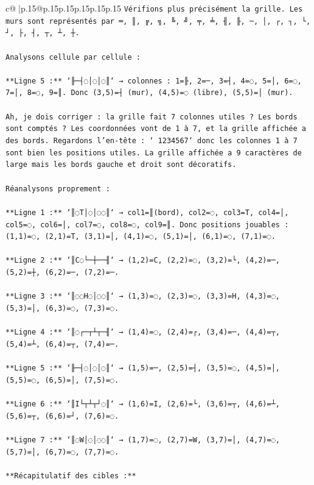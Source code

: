 \documentclass{article}
\begin{document}
{\begin{supertabular}{c@{$\;$}|p{.15\linewidth}@{}p{.15\linewidth}p{.15\linewidth}p{.15\linewidth}p{.15\linewidth}p{.15\linewidth}}
{{{\texttt{Vérifions plus précisément la grille. Les murs sont représentés par ═, ║, ╔, ╗, ╚, ╝, ╤, ╧, ╢, ╟, ─, │, ┌, ┐, └, ┘, ├, ┤, ┬, ┴, ┼.} \\
\\ 
\texttt{Analysons cellule par cellule :} \\
\\ 
\texttt{**Ligne 5 :** `╟─┤◌│◌│◌║` → colonnes : 1=╟, 2=─, 3=┤, 4=◌, 5=│, 6=◌, 7=│, 8=◌, 9=║. Donc (3,5)=┤ (mur), (4,5)=◌ (libre), (5,5)=│ (mur).} \\
\\ 
\texttt{Ah, je dois corriger : la grille fait 7 colonnes utiles ? Les bords sont comptés ? Les coordonnées vont de 1 à 7, et la grille affichée a des bords. Regardons l'en{-}tête : ` 1234567` donc les colonnes 1 à 7 sont bien les positions utiles. La grille affichée a 9 caractères de large mais les bords gauche et droit sont décoratifs.} \\
\\ 
\texttt{Réanalysons proprement :} \\
\\ 
\texttt{**Ligne 1 :** `║◌T│◌│◌◌║` → col1=║(bord), col2=◌, col3=T, col4=│, col5=◌, col6=│, col7=◌, col8=◌, col9=║. Donc positions jouables : (1,1)=◌, (2,1)=T, (3,1)=│, (4,1)=◌, (5,1)=│, (6,1)=◌, (7,1)=◌.} \\
\\ 
\texttt{**Ligne 2 :** `║C◌└─┼──╢` → (1,2)=C, (2,2)=◌, (3,2)=└, (4,2)=─, (5,2)=┼, (6,2)=─, (7,2)=─.} \\
\\ 
\texttt{**Ligne 3 :** `║◌◌H◌│◌◌║` → (1,3)=◌, (2,3)=◌, (3,3)=H, (4,3)=◌, (5,3)=│, (6,3)=◌, (7,3)=◌.} \\
\\ 
\texttt{**Ligne 4 :** `║◌┌─┬┴┬─╢` → (1,4)=◌, (2,4)=┌, (3,4)=─, (4,4)=┬, (5,4)=┴, (6,4)=┬, (7,4)=─.} \\
\\ 
\texttt{**Ligne 5 :** `╟─┤◌│◌│◌║` → (1,5)=─, (2,5)=┤, (3,5)=◌, (4,5)=│, (5,5)=◌, (6,5)=│, (7,5)=◌.} \\
\\ 
\texttt{**Ligne 6 :** `║I└┬┴┬┘◌║` → (1,6)=I, (2,6)=└, (3,6)=┬, (4,6)=┴, (5,6)=┬, (6,6)=┘, (7,6)=◌.} \\
\\ 
\texttt{**Ligne 7 :** `║◌W│◌│◌◌║` → (1,7)=◌, (2,7)=W, (3,7)=│, (4,7)=◌, (5,7)=│, (6,7)=◌, (7,7)=◌.} \\
\\ 
\texttt{**Récapitulatif des cibles :**} \\
}}}
\end{supertabular}}
\end{document}
